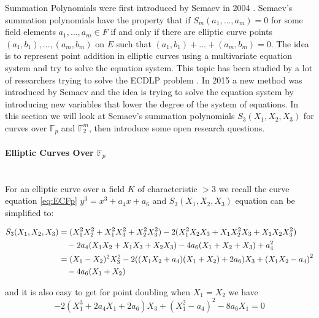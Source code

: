 Summation Polynomials were first introduced by Semaev in 2004 \cite{semaev2004summation}. Semaev's summation polynomials have the property that if $S_m(a_1,\dots,a_m) = 0 $ for some field elements $a_1,\dots,a_m \in F$ if and only if there are elliptic curve points $\left( a_1, b_1\right), \dots,\left( a_m,b_m \right) $ on $E$ such that $\left( a_1, b_1\right)+ \dots + \left( a_m, b_m\right) = 0 $. The idea is to represent point addition in elliptic curves using a multivariate equation system and try to solve the equation system. This topic has been studied by a lot of researchers trying to solve the ECDLP problem \cite{diem2011discrete,gaudry2004index,faugere2014using,faugere2012improving,petit2012polynomial,huang2013improvement}. In 2015 a new method was introduced by Semaev \cite{cryptoeprint:2015:310} and the idea is trying to solve the equation system by introducing new variables that lower the degree of the system of equations. In this section we will look at Semaev's summation polynomials $S_3\left( X_1,X_2,X_3\right) $ for curves over $\mathbb{F}_p$ and $\mathbb{F}_2^m$, then introduce some open research questions.  

\paragraph{Elliptic Curves Over $\mathbb{F}_p$} \mbox{} \\
For an elliptic curve over a field $K$ of characteristic $> 3$ we recall the curve equation \ref{eq:ECFp}
$y^3=x^3+a_4x+a_6$ and $S_3\left( X_1,X_2,X_3\right) $ equation can be simplified to: \cite{kosters2015notes} 

\begin{equation} \label{eq:fpCurveS3}
\begin{split}
S_3( X_1,X_2,X_3) &=( X_1^2X_2^2+X_1^2X_3^2+X_2^2X_3^2)- 2( X_1^2X_2X_3+X_1X_2^2X_3+X_1X_2X_3^2) \\
&\text{\space \space \space } -2a_4(X_1X_2+X_1X_3+X_2X_3 ) -4a_6( X_1+X_2+X_3) +a_4^2 \\
&= ( X_1-X_2)^2X_3^2-2( ( X_1X_2+a_4)(X_1+X_2 ) + 2a_6) X_3 + \left(X_1X_2-a_4 \right) ^2 \\
&\text{\space \space \space } - 4a_6(X_1+X_2)
\end{split}
\end{equation}

and it is also easy to get for point doubling when $X_1=X_2$ we have \\
\begin{equation} \label{eq:fpCurveS3Double}
-2\left( X_1^3 + 2a_4X_1+2a_6\right)X_3+\left( X_1^2 - a_4 \right)^2 - 8a_6X_1 = 0
\end{equation}
